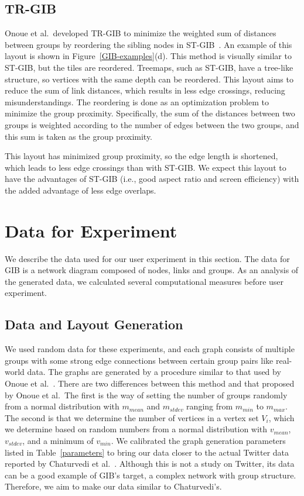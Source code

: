 \documentclass[review]{vgtc}                 %
\begin{document}
\subsection{TR-GIB}
Onoue et al.\ developed TR-GIB to minimize the weighted sum of distances between groups by reordering the sibling nodes in ST-GIB~\cite{onoue2017optimal}.
An example of this layout is shown in Figure~\ref{GIB-examples}(d).
This method is visually similar to ST-GIB, but the tiles are reordered.
Treemaps, such as ST-GIB, have a tree-like structure, so vertices with the same depth can be reordered.
This layout aims to reduce the sum of link distances, which results in less edge crossings, reducing misunderstandings.
The reordering is done as an optimization problem to minimize the group proximity.
Specifically, the sum of the distances between two groups is weighted according to the number of edges between the two groups, and this sum is taken as the group proximity.

This layout has minimized group proximity, so the edge length is shortened, which leads to less edge crossings than with ST-GIB.
We expect this layout to have the advantages of ST-GIB (i.e., good aspect ratio and screen efficiency) with the added advantage of less edge overlaps.

\section{Data for Experiment}

We describe the data used for our user experiment in this section.
The data for GIB is a network diagram composed of nodes, links and groups.
As an analysis of the generated data, we calculated several computational measures before user experiment.

\subsection{Data and Layout Generation}
\label{layout}

We used random data for these experiments, and each graph consists of multiple groups with some strong edge connections between certain group pairs like real-world data.
The graphs are generated by a procedure similar to that used by Onoue et al.~\cite{onoue2017optimal}.
There are two differences between this method and that proposed by Onoue et al.\ The first is the way of setting the number of groups randomly from a normal distribution with $m_{mean}$ and $m_{stdev}$ ranging from $m_{min}$ to $m_{max}$.
The second is that we determine the number of vertices in a vertex set $V_i$, which we determine based on random numbers from a normal distribution with $v_{mean}$, $v_{stdev}$, and a minimum of $v_{min}$.
We calibrated the graph generation parameters listed in Table~\ref{parameters} to bring our data closer to the actual Twitter data reported by Chaturvedi et al.~\cite{chaturvedi2014group}.
Although this is not a study on Twitter, its data can be a good example of GIB's target, a complex network with group structure.
Therefore, we aim to make our data similar to Chaturvedi's.
\end{document}

